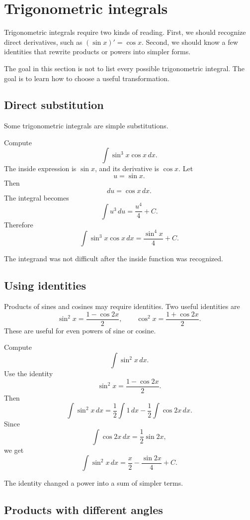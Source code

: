 \section{Trigonometric integrals}

Trigonometric integrals require two kinds of reading. First, we should recognize direct derivatives, such as \((\sin x)'=\cos x\). Second, we should know a few identities that rewrite products or powers into simpler forms.

The goal in this section is not to list every possible trigonometric integral. The goal is to learn how to choose a useful transformation.

\subsection*{Direct substitution}

Some trigonometric integrals are simple substitutions.

\begin{examplebox}
Compute
\[
\int \sin^3 x\cos x\,dx.
\]
The inside expression is \(\sin x\), and its derivative is \(\cos x\). Let
\[
u=\sin x.
\]
Then
\[
du=\cos x\,dx.
\]
The integral becomes
\[
\int u^3\,du=\frac{u^4}{4}+C.
\]
Therefore
\[
\int \sin^3 x\cos x\,dx=\frac{\sin^4 x}{4}+C.
\]
\end{examplebox}

The integrand was not difficult after the inside function was recognized.

\subsection*{Using identities}

Products of sines and cosines may require identities. Two useful identities are
\[
\sin^2 x=\frac{1-\cos 2x}{2},
\qquad
\cos^2 x=\frac{1+\cos 2x}{2}.
\]
These are useful for even powers of sine or cosine.

\begin{examplebox}
Compute
\[
\int \sin^2 x\,dx.
\]
Use the identity
\[
\sin^2 x=\frac{1-\cos 2x}{2}.
\]
Then
\[
\int \sin^2 x\,dx
=\frac12\int 1\,dx-\frac12\int \cos 2x\,dx.
\]
Since
\[
\int \cos 2x\,dx=\frac12\sin 2x,
\]
we get
\[
\int \sin^2 x\,dx=\frac{x}{2}-\frac{\sin 2x}{4}+C.
\]
\end{examplebox}

The identity changed a power into a sum of simpler terms.

\subsection*{Products with different angles}

